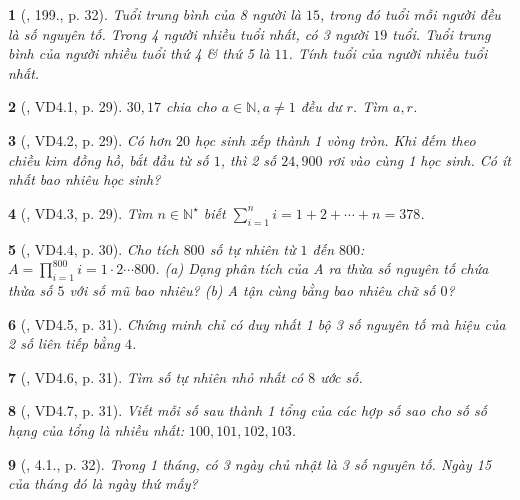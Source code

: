 \documentclass{article}
\newtheorem{baitoan}{}
\begin{document}
\begin{baitoan}[\cite{Binh_Toan_6_tap_1}, 199., p. 32]
	Tuổi trung bình của 8 người là $15$, trong đó tuổi mỗi người đều là số nguyên tố. Trong 4 người nhiều tuổi nhất, có 3 người $19$ tuổi. Tuổi trung bình của người nhiều tuổi thứ 4 \& thứ 5 là $11$. Tính tuổi của người nhiều tuổi nhất.
\end{baitoan}

\begin{baitoan}[\cite{TLCT_THCS_Toan_6_so_hoc}, VD4.1, p. 29]
	$30,17$ chia cho $a\in\mathbb{N},a\ne1$ đều dư $r$. Tìm $a,r$.
\end{baitoan}

\begin{baitoan}[\cite{TLCT_THCS_Toan_6_so_hoc}, VD4.2, p. 29]
	Có hơn $20$ học sinh xếp thành 1 vòng tròn. Khi đếm theo chiều kim đồng hồ, bắt đầu từ số $1$, thì 2 số $24,900$ rơi vào cùng 1 học sinh. Có ít nhất bao nhiêu học sinh?
\end{baitoan}

\begin{baitoan}[\cite{TLCT_THCS_Toan_6_so_hoc}, VD4.3, p. 29]
	Tìm $n\in\mathbb{N}^\star$ biết $\sum_{i=1}^n i = 1 + 2 + \cdots + n = 378$.
\end{baitoan}

\begin{baitoan}[\cite{TLCT_THCS_Toan_6_so_hoc}, VD4.4, p. 30]
	Cho tích $800$ số tự nhiên từ $1$ đến $800$: $A = \prod_{i=1}^{800} i = 1\cdot2\cdots800$. (a) Dạng phân tích của A ra thừa số nguyên tố chứa thừa số $5$ với số mũ bao nhiêu? (b) A tận cùng bằng bao nhiêu chữ số $0$?
\end{baitoan}

\begin{baitoan}[\cite{TLCT_THCS_Toan_6_so_hoc}, VD4.5, p. 31]
	Chứng minh chỉ có duy nhất 1 bộ 3 số nguyên tố mà hiệu của 2 số liên tiếp bằng $4$.
\end{baitoan}

\begin{baitoan}[\cite{TLCT_THCS_Toan_6_so_hoc}, VD4.6, p. 31]
	Tìm số tự nhiên nhỏ nhất có $8$ ước số.
\end{baitoan}

\begin{baitoan}[\cite{TLCT_THCS_Toan_6_so_hoc}, VD4.7, p. 31]
	Viết mỗi số sau thành 1 tổng của các hợp số sao cho số số hạng của tổng là nhiều nhất: $100,101,102,103$.
\end{baitoan}

\begin{baitoan}[\cite{TLCT_THCS_Toan_6_so_hoc}, 4.1., p. 32]
	Trong 1 tháng, có 3 ngày chủ nhật là 3 số nguyên tố. Ngày 15 của tháng đó là ngày thứ mấy?
\end{baitoan}
\end{document}
